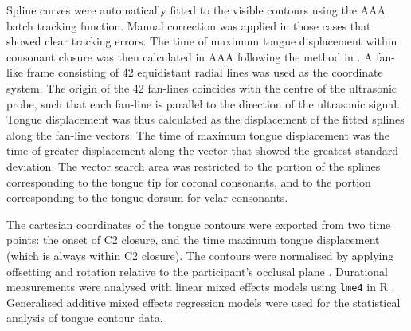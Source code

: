 \documentclass[authoryear, twocolumn]{elsarticle}
\begin{document}

Spline curves were automatically fitted to the visible contours using
the AAA batch tracking function. Manual correction was applied in those
cases that showed clear tracking errors. The time of maximum tongue
displacement within consonant closure was then calculated in AAA
following the method in \citet{strycharczuk2015}. A fan-like frame
consisting of 42 equidistant radial lines was used as the coordinate
system. The origin of the 42 fan-lines coincides with the centre of the
ultrasonic probe, such that each fan-line is parallel to the direction
of the ultrasonic signal. Tongue displacement was thus calculated as the
displacement of the fitted splines along the fan-line vectors. The time
of maximum tongue displacement was the time of greater displacement
along the vector that showed the greatest standard deviation. The vector
search area was restricted to the portion of the splines corresponding
to the tongue tip for coronal consonants, and to the portion
corresponding to the tongue dorsum for velar consonants.

The cartesian coordinates of the tongue contours were exported from two
time points: the onset of C2 closure, and the time maximum tongue
displacement (which is always within C2 closure). The contours were
normalised by applying offsetting and rotation relative to the
participant's occlusal plane \citep{scobbie2011}. Durational
measurements were analysed with linear mixed effects models using
\texttt{lme4} in R \citep{r-core-team2017, bates2015}. Generalised
additive mixed effects regression models \citep[GAMMs,][]{wood2006} were
used for the statistical analysis of tongue contour data.
\end{document}
